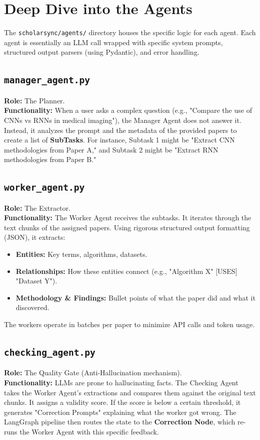 \documentclass[12pt, a4paper]{report}
\begin{document}
\newpage

\chapter{Deep Dive into the Agents}

The \texttt{scholarsync/agents/} directory houses the specific logic for each agent. Each agent is essentially an LLM call wrapped with specific system prompts, structured output parsers (using Pydantic), and error handling.

\section{\texttt{manager\_agent.py}}
\textbf{Role:} The Planner.\\
\textbf{Functionality:} When a user asks a complex question (e.g., "Compare the use of CNNs vs RNNs in medical imaging"), the Manager Agent does not answer it. Instead, it analyzes the prompt and the metadata of the provided papers to create a list of \textbf{SubTasks}. For instance, Subtask 1 might be "Extract CNN methodologies from Paper A," and Subtask 2 might be "Extract RNN methodologies from Paper B."

\section{\texttt{worker\_agent.py}}
\textbf{Role:} The Extractor.\\
\textbf{Functionality:} The Worker Agent receives the subtasks. It iterates through the text chunks of the assigned papers. Using rigorous structured output formatting (JSON), it extracts:
\begin{itemize}
    \item \textbf{Entities:} Key terms, algorithms, datasets.
    \item \textbf{Relationships:} How these entities connect (e.g., "Algorithm X" [USES] "Dataset Y").
    \item \textbf{Methodology \& Findings:} Bullet points of what the paper did and what it discovered.
\end{itemize}
The workers operate in batches per paper to minimize API calls and token usage.

\section{\texttt{checking\_agent.py}}
\textbf{Role:} The Quality Gate (Anti-Hallucination mechanism).\\
\textbf{Functionality:} LLMs are prone to hallucinating facts. The Checking Agent takes the Worker Agent's extractions and compares them against the original text chunks. It assigns a validity score. If the score is below a certain threshold, it generates "Correction Prompts" explaining what the worker got wrong. The LangGraph pipeline then routes the state to the \textbf{Correction Node}, which re-runs the Worker Agent with this specific feedback.
\end{document}
